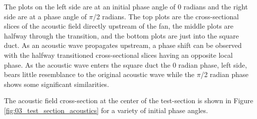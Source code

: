 The plots on the left side are at an initial phase angle of 0 radians and the right side are at a phase angle of $\pi$/2 radians.
The top plots are the cross-sectional slices of the acoustic field directly upstream of the fan, the middle plots are halfway through the transition, and the bottom plots are just into the square duct.
As an acoustic wave propagates upstream, a phase shift can be observed with the halfway transitioned cross-sectional slices having an opposite local phase.
As the acoustic wave enters the square duct the 0 radian phase, left side, bears little resemblance to the original acoustic wave while the $\pi$/2 radian phase shows some significant similarities.

The acoustic field cross-section at the center of the test-section is shown in Figure \ref{fig:03_test_section_acoustics} for a variety of initial phase angles.
